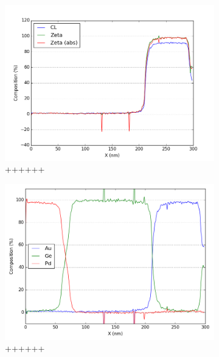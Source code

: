 \begin{figure}
\begin{subfigure}{.5\textwidth}
		\includegraphics[width=\linewidth]{fig/q/2_au_nm_GeL}
		\caption{++++++}
		\label{fig:zeta_area2_au}
	\end{subfigure}%
	\begin{subfigure}{.5\textwidth}
		\centering
		\includegraphics[width=\linewidth]{fig/q/2_all_abscorr_GeL}
		\caption{++++++}
		\label{fig:zeta_area2_all}
	\end{subfigure}
		\centering
	\begin{subfigure}{.5\textwidth}

\end{subfigure}
\end{figure}
